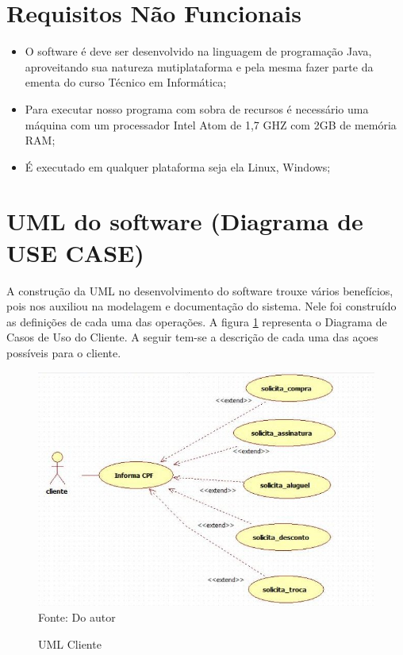 \section{Requisitos Não Funcionais}

\begin{itemize}

\item O software é deve ser desenvolvido na linguagem de programação Java, aproveitando sua natureza mutiplataforma e pela mesma fazer parte da ementa do curso Técnico em Informática;

\item Para executar nosso programa com sobra de recursos é necessário uma máquina com um processador Intel Atom de 1,7 GHZ com 2GB de memória RAM;

\item É executado em qualquer plataforma seja ela Linux, Windows;
\end{itemize}

\section {UML do software (Diagrama de USE CASE)}

A construção da UML no desenvolvimento do software trouxe vários benefícios, pois nos auxiliou na modelagem e 
documentação do sistema. Nele foi construído as definições de cada uma das operações. A figura \ref{uml_cliente}
representa o Diagrama de Casos de Uso do Cliente. A seguir tem-se a descrição de cada uma das açoes possíveis para
o cliente.


\begin{figure}[ht]
	\centering 
	\caption{UML Cliente}
	
	\label{uml_cliente}
	\includegraphics[scale = 0.7]{imagens/uml-cliente.jpg}
	\\Fonte: Do autor
\end{figure}


